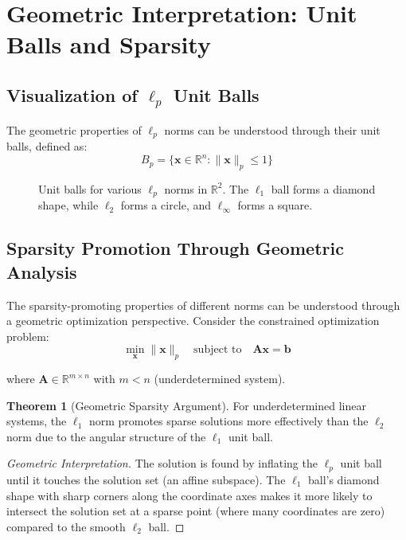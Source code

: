 \documentclass[12pt]{article}
\renewcommand{\vec}[1]{\mathbf{#1}}
\newcommand{\norm}[1]{\lVert#1\rVert}
\newcommand{\R}{\mathbb{R}}
\theoremstyle{definition}
\newtheorem{theorem}{Theorem}[section]
\begin{document}
\newpage

\section{Geometric Interpretation: Unit Balls and Sparsity}

\subsection{Visualization of $\ell_p$ Unit Balls}

The geometric properties of $\ell_p$ norms can be understood through their unit balls, defined as:
\begin{equation}
    B_p = \{\vec{x} \in \R^n : \norm{\vec{x}}_p \leq 1\}
\end{equation}

\begin{figure}[h]
    \centering
    \caption{Unit balls for various $\ell_p$ norms in $\R^2$. The $\ell_1$ ball forms a diamond shape, while $\ell_2$ forms a circle, and $\ell_\infty$ forms a square.}
\end{figure}

\subsection{Sparsity Promotion Through Geometric Analysis}

The sparsity-promoting properties of different norms can be understood through a geometric optimization perspective. Consider the constrained optimization problem:
\begin{equation}
    \min_{\vec{x}} \norm{\vec{x}}_p \quad \text{subject to} \quad \mathbf{A}\vec{x} = \vec{b}
\end{equation}

where $\mathbf{A} \in \R^{m \times n}$ with $m < n$ (underdetermined system).

\begin{theorem}[Geometric Sparsity Argument]
    For underdetermined linear systems, the $\ell_1$ norm promotes sparse solutions more effectively than the $\ell_2$ norm due to the angular structure of the $\ell_1$ unit ball.
\end{theorem}

\begin{proof}[Geometric Interpretation]
    The solution is found by inflating the $\ell_p$ unit ball until it touches the solution set (an affine subspace). The $\ell_1$ ball's diamond shape with sharp corners along the coordinate axes makes it more likely to intersect the solution set at a sparse point (where many coordinates are zero) compared to the smooth $\ell_2$ ball.
\end{proof}
\end{document}
